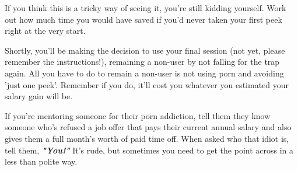 \documentclass[easypeasy.tex]{subfiles}
\begin{document}
If you think this is a tricky way of seeing it, you're still kidding yourself. Work out how much time you would have saved if you'd never taken your first peek right at the very start.

Shortly, you'll be making the decision to use your final session (not yet, please remember the instructions!), remaining a non-user by not falling for the trap again. All you have to do to remain a non-user is not using porn and avoiding 'just one peek'. Remember if you do, it'll cost you whatever you estimated your salary gain will be.

If you're mentoring someone for their porn addiction, tell them they know someone who's refused a job offer that pays their current annual salary and also gives them a full month's worth of paid time off. When asked who that idiot is, tell them, \textbf{\textit{"You!"}} It's rude, but sometimes you need to get the point across in a less than polite way.
\end{document}
